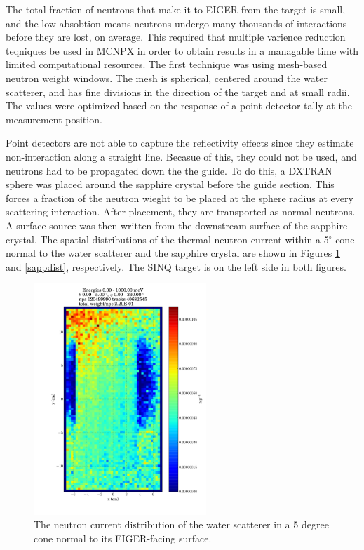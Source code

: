 \documentclass[a4paper,
              ]{jacow}
\begin{document}
The total fraction of neutrons that make it to EIGER from the target is small, and the low absobtion means neutrons undergo many thousands of interactions before they are lost, on average.  This required that multiple varience reduction teqniques be used in MCNPX in order to obtain results in a managable time with limited computational resources.  The first technique was using mesh-based neutron weight windows.  The mesh is spherical, centered around the water scatterer, and has fine divisions in the direction of the target and at small radii.  The values were optimized based on the response of a point detector tally at the measurement position.  %


Point detectors are not able to capture the reflectivity effects since they estimate non-interaction along a straight line.  Becasue of this, they could not be used, and neutrons had to be propagated down the the guide.  To do this, a DXTRAN sphere was placed around the sapphire crystal before the guide section.  This forces a fraction of the neutron wieght to be placed at the sphere radius at every scattering interaction.  After placement, they are transported as normal neutrons.  A surface source was then written from the downstream surface of the sapphire crystal.  The spatial distributions of the thermal neutron current within a 5$^\circ$ cone normal to the water scatterer and the sapphire crystal are shown in Figures \ref{wsdist} and \ref{sappdist}, respectively.  The SINQ target is on the left side in both figures.

\begin{figure}[!htb]
   \centering
   \includegraphics*[trim = 0mm 20mm 0mm 7mm, width=65mm]{graphics/wsdist.pdf}
   \caption{The neutron current distribution of the water scatterer in a 5 degree cone normal to its EIGER-facing surface.}
   \label{wsdist}
\end{figure}
\end{document}

